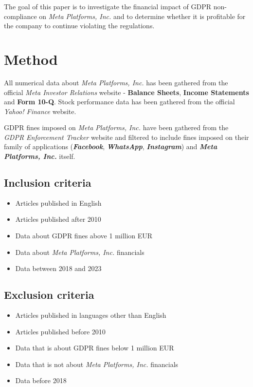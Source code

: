 \documentclass[12pt, a4paper]{article}
\begin{document}
The goal of this paper is to investigate the financial impact of GDPR
non-compliance on \textit{Meta Platforms, Inc.} and to determine whether it is
profitable for the company to continue violating the regulations.

\section*{Method}

All numerical data about \textit{Meta Platforms, Inc.} has been gathered from
the official \textit{Meta Investor Relations} website\cite{fbMetaFinancials} -
\textbf{Balance Sheets}, \textbf{Income Statements} and \textbf{Form 10-Q}.
Stock performance data has been gathered from the official \textit{Yahoo!
Finance} website\cite{stockPrice}.

GDPR fines imposed on \textit{Meta Platforms, Inc.} have been gathered from the
\textit{GDPR Enforcement Tracker}
website\cite{enforcementtrackerGDPREnforcement} and filtered to include fines
imposed on their family of applications (\textbf{\textit{Facebook}},
\textbf{\textit{WhatsApp}}, \textbf{\textit{Instagram}}) and
\textbf{\textit{Meta Platforms, Inc.}} itself.

\subsection*{Inclusion criteria}

\begin{itemize}
    \item Articles published in English
    \item Articles published after 2010
    \item Data about GDPR fines above 1 million EUR
    \item Data about \textit{Meta Platforms, Inc.} financials
    \item Data between 2018 and 2023
\end{itemize}

\subsection*{Exclusion criteria}

\begin{itemize}
    \item Articles published in languages other than English
    \item Articles published before 2010
    \item Data that is about GDPR fines below 1 million EUR
    \item Data that is not about \textit{Meta Platforms, Inc.} financials
    \item Data before 2018
\end{itemize}
\end{document}
